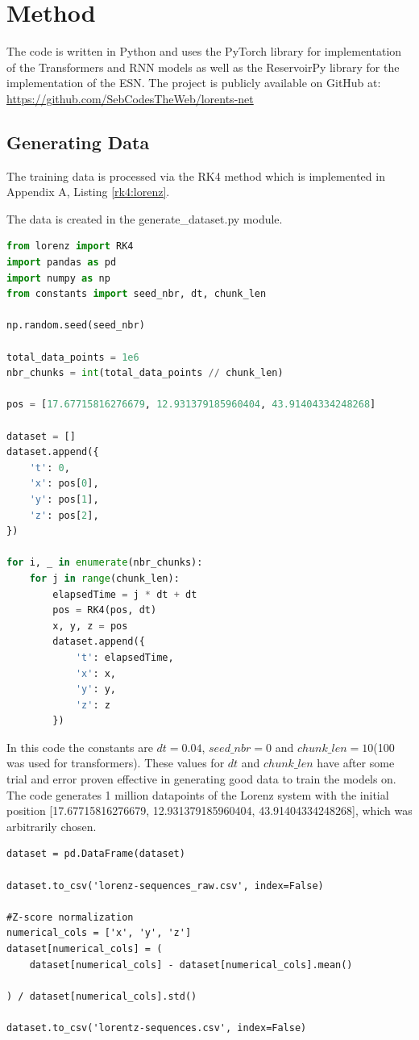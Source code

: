 \documentclass[11pt]{article}
\begin{document}
\section{Method}
The code is written in Python and uses the PyTorch library for implementation of the Transformers and RNN models as well as the ReservoirPy library for the implementation of the ESN. The project is publicly available on GitHub at: \url{https://github.com/SebCodesTheWeb/lorents-net}


\subsection{Generating Data}

The training data is processed via the RK4 method which is implemented in Appendix A, Listing \ref{rk4:lorenz}.

The data is created in the {generate\_dataset.py} module.

\begin{lstlisting}[language=Python]
from lorenz import RK4
import pandas as pd
import numpy as np
from constants import seed_nbr, dt, chunk_len

np.random.seed(seed_nbr)

total_data_points = 1e6
nbr_chunks = int(total_data_points // chunk_len)

pos = [17.67715816276679, 12.931379185960404, 43.91404334248268]

dataset = []
dataset.append({
    't': 0,
    'x': pos[0],
    'y': pos[1],
    'z': pos[2],
})

for i, _ in enumerate(nbr_chunks):
    for j in range(chunk_len):
        elapsedTime = j * dt + dt
        pos = RK4(pos, dt)
        x, y, z = pos
        dataset.append({
            't': elapsedTime,
            'x': x,
            'y': y,
            'z': z
        })
\end{lstlisting}

In this code the constants are $dt = 0.04$, $seed\_nbr = 0$ and $chunk\_len = 10$(100 was used for transformers). These values for $dt$ and $chunk\_len$ have after some trial and error proven effective in generating good data to train the models on. The code generates 1 million datapoints of the Lorenz system with the initial position [17.67715816276679, 12.931379185960404, 43.91404334248268], which was arbitrarily chosen. 

\begin{lstlisting}
dataset = pd.DataFrame(dataset)

dataset.to_csv('lorenz-sequences_raw.csv', index=False)

#Z-score normalization
numerical_cols = ['x', 'y', 'z']
dataset[numerical_cols] = (
    dataset[numerical_cols] - dataset[numerical_cols].mean()

) / dataset[numerical_cols].std()

dataset.to_csv('lorentz-sequences.csv', index=False)
\end{lstlisting}
\end{document}

